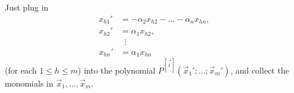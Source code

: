\documentclass{Vorlesungstemplate_English} %
\begin{document}
\begin{colorpf}
  Just plug in
  \begin{align*} x_{h1}' &= -\alpha_2 x_{h2} - \dots - \alpha_n x_{hn}, \\ x_{h2}' &= \alpha_1 x_{h2}, \\ &\;\;\vdots \\ x_{hn}' &= \alpha_1 x_{hn} \end{align*}
  (for each $1 \leq h \leq m$) into the polynomial $P^{[\vec i]}(\vec x_1'; \dots; \vec x_m')$, and collect the monomials in $\vec x_1, \dots, \vec x_m$.
\end{colorpf}

\color{black}
\end{document}
